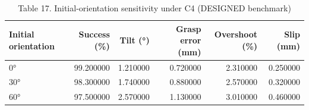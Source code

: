 \begin{table}
\caption{Table 17. Initial-orientation sensitivity under C4 (DESIGNED benchmark)}
\label{tab:table17}
\begin{tabular}{lrrrrr}
\toprule
Initial orientation & Success (\%) & Tilt (°) & Grasp error (mm) & Overshoot (\%) & Slip (mm) \\
\midrule
0° & 99.200000 & 1.210000 & 0.720000 & 2.310000 & 0.250000 \\
30° & 98.300000 & 1.740000 & 0.880000 & 2.570000 & 0.320000 \\
60° & 97.500000 & 2.570000 & 1.130000 & 3.010000 & 0.460000 \\
\bottomrule
\end{tabular}
\end{table}

